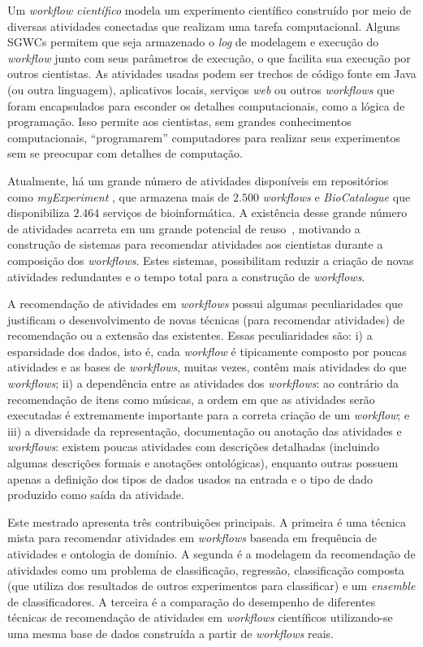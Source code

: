 Um \emph{workflow científico} modela um experimento científico construído por meio de diversas atividades conectadas que realizam uma tarefa computacional. Alguns SGWCs permitem que seja armazenado o \emph{log} de modelagem e execução do \emph{workflow} junto com seus parâmetros de execução, o que facilita sua execução por outros cientistas. As atividades usadas podem ser trechos de código fonte em Java (ou outra linguagem), aplicativos locais, serviços \emph{web} ou outros \emph{workflows} que foram encapsulados para esconder os detalhes computacionais, como a lógica de programação. Isso permite aos cientistas, sem grandes conhecimentos computacionais, ``programarem'' computadores para realizar seus experimentos sem se preocupar com detalhes de computação.

Atualmente, há um grande número de atividades disponíveis em repositórios como \emph{myExperiment} \cite{ROURE2015}, que armazena mais de \(2.500\) \emph{workflows} e \emph{BioCatalogue} \cite{Biocatalogue} que disponibiliza \(2.464\) serviços de bioinformática. A existência desse grande número de atividades acarreta em um grande potencial de reuso~\cite{Wang2010}, motivando a construção de sistemas para recomendar atividades aos cientistas durante a composição dos \emph{workflows}. Estes sistemas, possibilitam reduzir a criação de novas atividades redundantes e o tempo total para a construção de \emph{workflows}.

A recomendação de atividades em \emph{workflows} possui algumas peculiaridades que justificam o desenvolvimento de novas técnicas (para recomendar atividades) de recomendação ou a extensão das existentes. Essas peculiaridades são: i) a esparsidade dos dados, isto é, cada  \emph{workflow} é tipicamente composto por poucas atividades e as bases de  \emph{workflows}, muitas vezes, contêm mais atividades do que  \emph{workflows}; ii) a dependência entre as atividades dos  \emph{workflows}: ao contrário da recomendação de itens como músicas, a ordem em que as atividades serão executadas é extremamente importante para a correta criação de um  \emph{workflow}; e iii) a diversidade da representação, documentação ou anotação das atividades e  \emph{workflows}: existem poucas atividades com descrições detalhadas (incluindo algumas descrições formais e anotações ontológicas), enquanto outras possuem apenas a definição dos tipos de dados usados na entrada e o tipo de dado produzido como saída da atividade.

Este mestrado apresenta três contribuições principais. A primeira é uma técnica mista para recomendar atividades em  \emph{workflows} baseada em frequência de atividades e ontologia de domínio. A segunda é a modelagem da recomendação de atividades como um problema de classificação, regressão, classificação composta (que utiliza dos resultados de outros experimentos para classificar) e um \emph{ensemble} de classificadores. A terceira é a comparação do desempenho de diferentes técnicas de recomendação de atividades em  \emph{workflows} científicos utilizando-se uma mesma base de dados construída a partir de \emph{workflows} reais.


